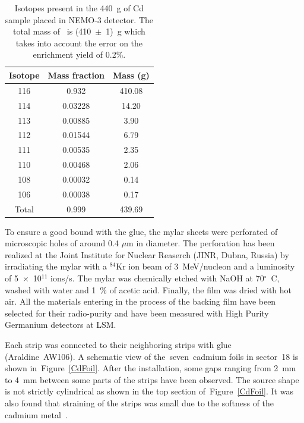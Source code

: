 \documentclass[main.tex]{subfiles}
\begin{document}
\begin{table}[h!]
\begin{center}
\begin{tabular}{c|c|c}
\toprule
Isotope & Mass fraction & Mass (g) \\
\hline
116   & 0.932   & 410.08 \\[0.05cm]
114   & 0.03228 & 14.20  \\[0.05cm]
113   & 0.00885 & 3.90   \\[0.05cm]
112   & 0.01544 & 6.79   \\[0.05cm]
111   & 0.00535 & 2.35   \\[0.05cm]
110   & 0.00468 & 2.06   \\[0.05cm]
108   & 0.00032 & 0.14   \\[0.05cm]
106   & 0.00038 & 0.17   \\[0.05cm]
Total & 0.999   & 439.69 \\[0.05cm]
\bottomrule
\end{tabular}
\end{center}
\caption{Isotopes present in the 440~g of Cd sample placed in NEMO-3 detector. The total mass of \Cd~is (410~$\pm$~1)~g which takes into account the error on the enrichment yield of 0.2\%.}
\label{tab:IsotopeCdTable}
\end{table}


\bigskip


\NI To ensure a good bound with the glue, the mylar sheets were perforated of microscopic holes of around 0.4 $\mu$m in diameter. The perforation has been realized at the Joint Institute for Nuclear Reaserch (JINR, Dubna, Russia) by irradiating the mylar with a $^{\text{84}}$Kr ion beam of 3~MeV/nucleon and a luminosity of 5~$\times$~10$^{\text{11}}$ ions/s. The mylar was chemically etched with NaOH at 70$^{\circ}$~C, washed with water and 1~\% of acetic acid. Finally, the film was dried with hot air. All the materials entering in the process of the backing film have been selected for their radio-purity and have been measured with High Purity Germanium detectors at LSM.


\bigskip


\NI Each strip was connected to their neighboring strips with glue (Araldine~AW106). A schematic view of the~seven~cadmium foils in sector~18 is shown in~Figure~\ref{CdFoil}. After the installation, some gaps ranging from 2~mm to 4~mm between some parts of the strips have been observed. The source shape is not strictly cylindrical as shown in the top section of~Figure~\ref{CdFoil}. It was also found that straining of the strips was small due to the softness of the cadmium metal~\cite{SoftnessCdMetal}. 
\end{document}
